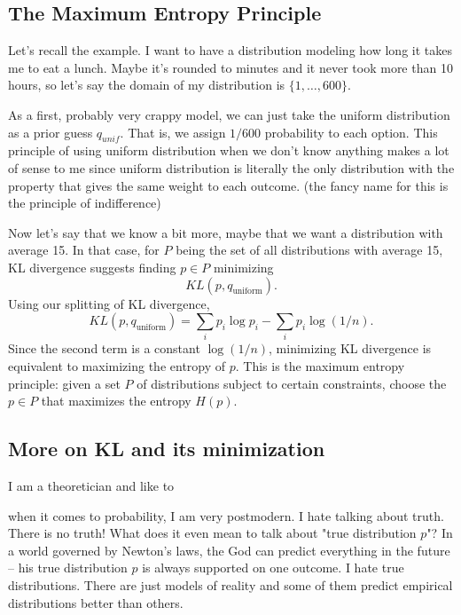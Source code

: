 \documentclass{article}
\begin{document}
\subsection{The Maximum Entropy Principle}

Let's recall the example. I want to have a distribution modeling how long it takes me to eat a lunch.  Maybe it's rounded to minutes and it never took more than 10 hours, so let's say the domain of my distribution is $\{1, \dots, 600\}$. 

As a first, probably very crappy model, we can just take the uniform distribution as a prior guess $q_{unif}$. That is, we assign $1/600$ probability to each option. This principle of using uniform distribution when we don't know anything makes a lot of sense to me since uniform distribution is literally the only distribution with the property that gives the same weight to each outcome. (the fancy name for this is the principle of indifference)

Now let's say that we know a bit more, maybe that we want a distribution with average 15. In that case, for $P$ being the set of all distributions with average 15, KL divergence suggests finding $p \in P$ minimizing
\[
KL(p,q_\text{uniform}).
\]
Using our splitting of KL divergence,
\[
KL(p,q_\text{uniform}) = \sum_i p_i\log p_i - \sum_i p_i\log (1/n).
\]
Since the second term is a constant \(\log (1/n)\), minimizing KL divergence is equivalent to maximizing the entropy of \(p\). This is the maximum entropy principle: given a set \(P\) of distributions subject to certain constraints, choose the \(p\in P\) that maximizes the entropy \(H(p)\).


\subsection{More on KL and its minimization}


I am a theoretician and like to 



when it comes to probability, I am very postmodern. I hate talking about truth. There is no truth! What does it even mean to talk about "true distribution $p$"? In a world governed by Newton's laws, the God can predict everything in the future -- his true distribution $p$ is always supported on one outcome. I hate true distributions. There are just models of reality and some of them predict empirical distributions better than others. 
\end{document}
